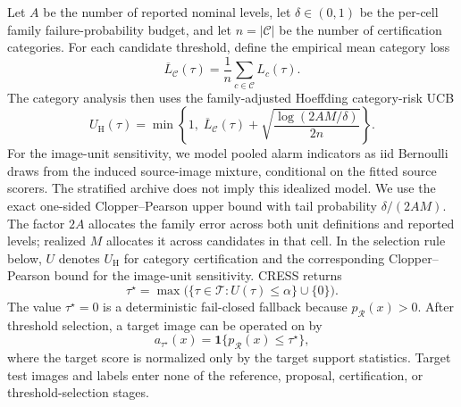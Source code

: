 Let $A$ be the number of reported nominal levels, let $\delta\in(0,1)$ be the per-cell family failure-probability budget, and let $n=|\mathcal{C}|$ be the number of certification categories. For each candidate threshold, define the empirical mean category loss
\begin{equation}\label{eq:cress-mean-category-loss}
    \overline{L}_{\mathcal C}(\tau)=\frac{1}{n}\sum_{c\in\mathcal{C}}L_c(\tau).
\end{equation}
The category analysis then uses the family-adjusted Hoeffding category-risk UCB
\begin{equation}\label{eq:cress-ucb}
    U_{\mathrm{H}}(\tau)=\min\!\left\{1,\;
    \overline{L}_{\mathcal C}(\tau)+
    \sqrt{\frac{\log(2AM/\delta)}{2n}}\right\}.
\end{equation}
For the image-unit sensitivity, we model pooled alarm indicators as iid Bernoulli draws from the induced source-image mixture, conditional on the fitted source scorers. The stratified archive does not imply this idealized model. We use the exact one-sided Clopper--Pearson upper bound with tail probability $\delta/(2AM)$. The factor $2A$ allocates the family error across both unit definitions and reported levels; realized $M$ allocates it across candidates in that cell. In the selection rule below, $U$ denotes $U_{\mathrm H}$ for category certification and the corresponding Clopper--Pearson bound for the image-unit sensitivity. CRESS returns
\begin{equation}\label{eq:cress-selected-threshold}
    \tau^\star=
    \max\bigl(\{\tau\in\mathcal{T}:U(\tau)\leq\alpha\}\cup\{0\}\bigr).
\end{equation}
The value $\tau^\star=0$ is a deterministic fail-closed fallback because $p_{\mathcal{R}}(x)>0$. After threshold selection, a target image can be operated on by
\begin{equation}\label{eq:cress-target-decision}
    a_{\tau^\star}(x)
    =\mathbf{1}\{p_{\mathcal{R}}(x)\leq\tau^\star\},
\end{equation}
where the target score is normalized only by the target support statistics. Target test images and labels enter none of the reference, proposal, certification, or threshold-selection stages.

